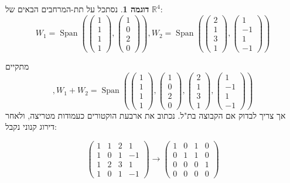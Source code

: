 \documentclass[12pt]{report}
\theoremstyle{plain}
\theoremstyle{definition}
\newtheorem{example}{דוגמה}[chapter]
\newcommand{\R}{\mathbb{R}}
\newcommand{\0}{\mathbf{0}}
\DeclareMathOperator{\Span}{Span}
\begin{document}
\begin{example}
נסתכל על תת-המרחבים הבאים של 
$\R^4$:
$$
W_1=\Span\left(\begin{pmatrix}
1 \\
1 \\
1 \\
1   
\end{pmatrix},\begin{pmatrix}
1 \\
0 \\
2 \\
0   
\end{pmatrix}\right),W_2=\Span\left(\begin{pmatrix}
2 \\
1 \\
3 \\
1   
\end{pmatrix},\begin{pmatrix}
1 \\
-1 \\
1 \\
-1   
\end{pmatrix}\right)
$$

מתקיים
$$
,W_1+W_2=\Span\left(\begin{pmatrix}
1 \\
1 \\
1 \\
1   
\end{pmatrix},\begin{pmatrix}
1 \\
0 \\
2 \\
0   
\end{pmatrix},\begin{pmatrix}
2 \\
1 \\
3 \\
1   
\end{pmatrix},\begin{pmatrix}
1 \\
-1 \\
1 \\
-1   
\end{pmatrix}\right)
$$
אך צריך לבדוק אם הקבוצה בת"ל. נכתוב את ארבעת הוקטורים כעמודות מטריצה, ולאחר דירוג קנוני נקבל:

$$
\begin{pmatrix}
1 & 1 & 2 & 1 \\
1 & 0 & 1 & -1 \\
1 & 2 & 3 & 1 \\
1 & 0 & 1 & -1
\end{pmatrix} \xrightarrow{} \begin{pmatrix}
1 & 0 & 1 & 0 \\
0 & 1 & 1 & 0 \\
0 & 0 & 0 & 1 \\
0 & 0 & 0 & 0
\end{pmatrix}
$$


\end{example}
\end{document}
